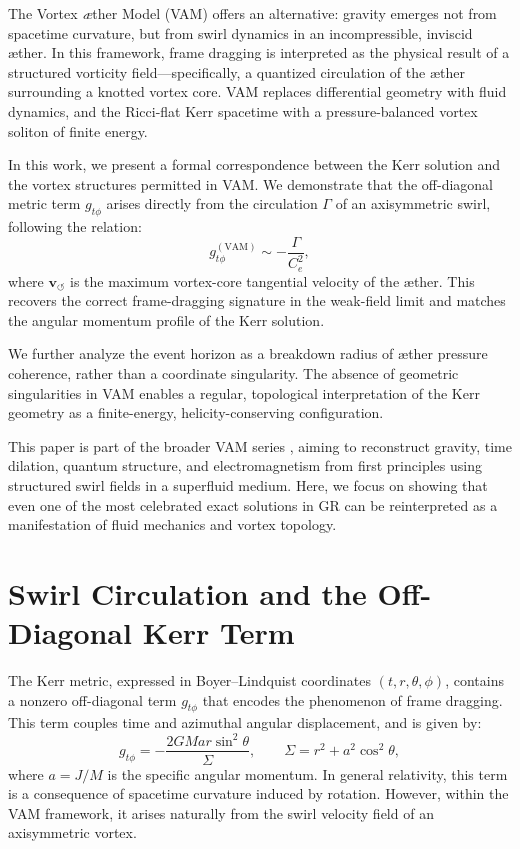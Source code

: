 \documentclass[twocolumn,aps,pre,floatfix,nofootinbib]{revtex4-2}
\begin{document}
    The Vortex \textit{\ae}ther Model (VAM) \cite{VAM-0,VAM-1,VAM-2} offers an alternative: gravity emerges not from spacetime curvature, but from swirl dynamics in an incompressible, inviscid æther. In this framework, frame dragging is interpreted as the physical result of a structured vorticity field—specifically, a quantized circulation of the æther surrounding a knotted vortex core. VAM replaces differential geometry with fluid dynamics, and the Ricci-flat Kerr spacetime with a pressure-balanced vortex soliton of finite energy.

    In this work, we present a formal correspondence between the Kerr solution and the vortex structures permitted in VAM. We demonstrate that the off-diagonal metric term \( g_{t\phi} \) arises directly from the circulation \( \Gamma \) of an axisymmetric swirl, following the relation:
    \[
        g_{t\phi}^{(\text{VAM})} \sim -\frac{\Gamma}{C_e^2},
    \]
    where \( \mathbf{v}_{\scriptscriptstyle\boldsymbol{\circlearrowleft}} \) is the maximum vortex-core tangential velocity of the æther. This recovers the correct frame-dragging signature in the weak-field limit and matches the angular momentum profile of the Kerr solution.

    We further analyze the event horizon as a breakdown radius of æther pressure coherence, rather than a coordinate singularity. The absence of geometric singularities in VAM enables a regular, topological interpretation of the Kerr geometry as a finite-energy, helicity-conserving configuration.

    This paper is part of the broader VAM series \cite{VAM-0,VAM-1,VAM-2,VAM-4,VAM-5,VAM-6}, aiming to reconstruct gravity, time dilation, quantum structure, and electromagnetism from first principles using structured swirl fields in a superfluid medium. Here, we focus on showing that even one of the most celebrated exact solutions in GR can be reinterpreted as a manifestation of fluid mechanics and vortex topology.





    \section{Swirl Circulation and the Off-Diagonal Kerr Term}

    The Kerr metric, expressed in Boyer--Lindquist coordinates $(t, r, \theta, \phi)$, contains a nonzero off-diagonal term $g_{t\phi}$ that encodes the phenomenon of frame dragging. This term couples time and azimuthal angular displacement, and is given by:
    \begin{equation}
        g_{t\phi} = -\frac{2 G M a r \sin^2\theta}{\Sigma}, \qquad \Sigma = r^2 + a^2 \cos^2\theta,
    \end{equation}
    where $a = J/M$ is the specific angular momentum. In general relativity, this term is a consequence of spacetime curvature induced by rotation. However, within the VAM framework, it arises naturally from the swirl velocity field of an axisymmetric vortex.
\end{document}
